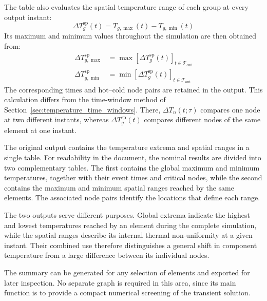 The table also evaluates the spatial temperature range of each group at every
output instant:
\begin{equation}
    \Delta T_g^{\mathrm{sp}}(t)
    =
    T_{g,\max}(t)-T_{g,\min}(t)
    \label{eq:summary_spatial_delta_t}
\end{equation}
Its maximum and minimum values throughout the simulation are then obtained
from:
\begin{align}
    \Delta T_{g,\max}^{\mathrm{sp}}
    &=
    \max\!\left[
        \Delta T_g^{\mathrm{sp}}(t)
    \right]_{t\in\mathcal{T}_{\mathrm{out}}}
    \label{eq:summary_spatial_delta_t_max}
    \\
    \Delta T_{g,\min}^{\mathrm{sp}}
    &=
    \min\!\left[
        \Delta T_g^{\mathrm{sp}}(t)
    \right]_{t\in\mathcal{T}_{\mathrm{out}}}
    \label{eq:summary_spatial_delta_t_min}
\end{align}
The corresponding times and hot--cold node pairs are retained in the output.
This calculation differs from the time-window method of
Section~\ref{sec:temperature_time_windows}. There,
\(\Delta T_n(t;\tau)\) compares one node at two different instants, whereas
\(\Delta T_g^{\mathrm{sp}}(t)\) compares different nodes of the same element
at one instant.

The original output contains the temperature extrema and spatial ranges in a
single table. For readability in the document, the nominal results are
divided into two complementary tables. The first contains the global maximum
and minimum temperatures, together with their event times and critical nodes,
while the second contains the maximum and
minimum spatial ranges reached by the same elements. The associated node pairs
identify the locations that define each range.


\NominalThermalExtremaTable[0.75\textwidth]

\NominalThermalRangeTable[0.85\textwidth]

The two outputs serve different purposes. Global extrema indicate the highest
and lowest temperatures reached by an element during the complete simulation,
while the spatial ranges describe its internal thermal non-uniformity at a
given instant. Their combined use therefore distinguishes a general shift in
component temperature from a large difference between its individual nodes.

The summary can be generated for any selection of elements and exported for
later inspection. No separate graph is required in this area, since its main
function is to provide a compact numerical screening of the transient
solution.

